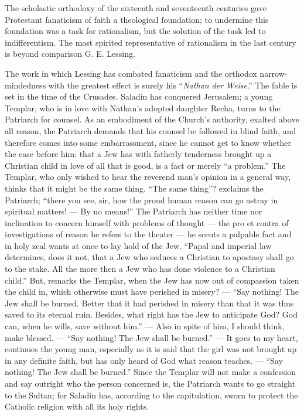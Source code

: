 \documentclass[12pt,a4paper,openany]{book}
\newcommand{\opage}[1]{\marginnote{\footnotesize\textit{[#1]}}}
\begin{document}
The scholastic orthodoxy of the sixteenth and seventeenth centuries gave Protestant
fanaticism of faith a
theological foundation; to undermine this foundation was
a task for rationalism, but the solution of the task
led to indifferentism. The most spirited representative
of rationalism in the last century is beyond comparison
G. E. Lessing.

The work in which Lessing has combated fanaticism and the orthodox
\setcounter{footnote}{0}%
\opage{605}narrow-mindedness with the greatest effect is surely his ``\emph{Nathan der Weise}.'' The fable
is set in the time of the Crusades. Saladin has conquered
Jerusalem; a young Templar, who is in love with Nathan's
adopted daughter Recha, turns to the Patriarch
for counsel. As an embodiment of the Church's
authority, exalted above all reason, the Patriarch demands
that his counsel be followed in blind faith, and therefore comes
into some embarrassment, since he cannot get
to know whether the case before him: that a Jew has with
fatherly tenderness brought up a Christian child in love
of all that is good, is a fact or merely ``a problem.'' The Templar,
who only wished to hear the reverend
man's opinion in a general way, thinks that it might be the
same thing. ``The same thing''? exclaims the Patriarch; ``there
you see, sir, how the proud human reason can
go astray in spiritual matters! --- By no means!'' The Patriarch
has neither time nor inclination to concern himself
with problems of thought --- the pro et
contra of investigations of reason he refers to the theater --- he scents a palpable
fact and in holy zeal wants at once to lay
hold of the Jew. ``Papal and imperial law determines,
does it not, that a Jew who seduces a Christian to apostasy
shall go to the stake. All the more then a Jew who has
done violence to a Christian child.'' But, remarks the Templar,
when the Jew has now out of compassion taken
the child in, which otherwise must have perished in
misery? --- ``Say nothing! The Jew shall be burned. Better
that it had perished in misery than that it was thus saved
to its eternal ruin. Besides,
what right has the Jew to anticipate God? God can,
when he wills, save without him.'' --- Also in spite of him,
\setcounter{footnote}{0}%
\opage{606}I should think, make blessed. --- ``Say nothing! The Jew
shall be burned.'' --- It goes to my heart, continues
the young man, especially as it is said that the girl was not
brought up in any definite faith, but has only heard of
God what reason teaches. --- ``Say nothing! The Jew shall
be burned.'' Since the Templar will not make a confession
and say outright who the person concerned is, the
Patriarch wants to go straight to the Sultan; for Saladin has, according to
the capitulation, sworn to protect the Catholic religion
with all its holy rights.
\end{document}
